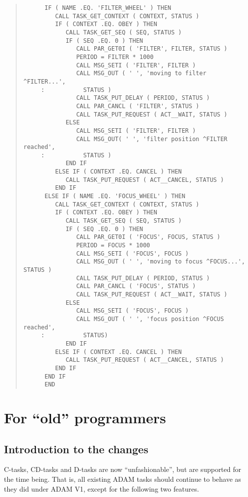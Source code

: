 \documentclass[twoside,11pt]{article}
\newcommand{\xlabel}[1]{}
\renewcommand{\_}{\texttt{\symbol{95}}}
\begin{document}
\begin{quote}
\begin{verbatim}
      IF ( NAME .EQ. 'FILTER_WHEEL' ) THEN
         CALL TASK_GET_CONTEXT ( CONTEXT, STATUS )
         IF ( CONTEXT .EQ. OBEY ) THEN
            CALL TASK_GET_SEQ ( SEQ, STATUS )
            IF ( SEQ .EQ. 0 ) THEN
               CALL PAR_GET0I ( 'FILTER', FILTER, STATUS )
               PERIOD = FILTER * 1000
               CALL MSG_SETI ( 'FILTER', FILTER )
               CALL MSG_OUT ( ' ', 'moving to filter ^FILTER...',
     :           STATUS )
               CALL TASK_PUT_DELAY ( PERIOD, STATUS )
               CALL PAR_CANCL ( 'FILTER', STATUS )
               CALL TASK_PUT_REQUEST ( ACT__WAIT, STATUS )
            ELSE
               CALL MSG_SETI ( 'FILTER', FILTER )
               CALL MSG_OUT( ' ', 'filter position ^FILTER reached',
     :           STATUS )
            END IF
         ELSE IF ( CONTEXT .EQ. CANCEL ) THEN
            CALL TASK_PUT_REQUEST ( ACT__CANCEL, STATUS )
         END IF
      ELSE IF ( NAME .EQ. 'FOCUS_WHEEL' ) THEN
         CALL TASK_GET_CONTEXT ( CONTEXT, STATUS )
         IF ( CONTEXT .EQ. OBEY ) THEN
            CALL TASK_GET_SEQ ( SEQ, STATUS )
            IF ( SEQ .EQ. 0 ) THEN
               CALL PAR_GET0I ( 'FOCUS', FOCUS, STATUS )
               PERIOD = FOCUS * 1000
               CALL MSG_SETI ( 'FOCUS', FOCUS )
               CALL MSG_OUT ( ' ', 'moving to focus ^FOCUS...', STATUS )
               CALL TASK_PUT_DELAY ( PERIOD, STATUS )
               CALL PAR_CANCL ( 'FOCUS', STATUS )
               CALL TASK_PUT_REQUEST ( ACT__WAIT, STATUS )
            ELSE
               CALL MSG_SETI ( 'FOCUS', FOCUS )
               CALL MSG_OUT ( ' ', 'focus position ^FOCUS reached',
     :           STATUS)
            END IF
         ELSE IF ( CONTEXT .EQ. CANCEL ) THEN
            CALL TASK_PUT_REQUEST ( ACT__CANCEL, STATUS )
         END IF
      END IF
      END
\end{verbatim} \end{quote} \normalsize

\newpage

\section{\xlabel{for_old_programmers}\label{old}For ``old'' programmers}

\subsection{Introduction to the changes}

C-tasks, CD-tasks and D-tasks are now ``unfashionable'', but are supported
for the time being. That is, all existing ADAM tasks should continue to
behave as they did under ADAM V1, except for the following two features.
\end{document}
